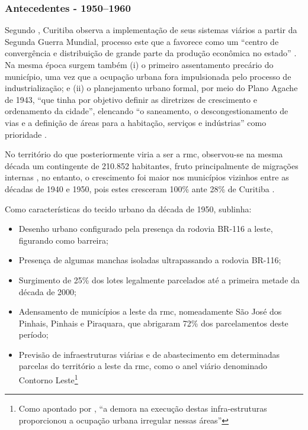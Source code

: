 	\subsubsection{Antecedentes - 1950--1960}
	Segundo , Curitiba observa a implementação de seus sistemas viários a partir da Segunda Guerra Mundial, processo este que a favorece como um ``centro de convergência e distribuição de grande parte da produção econômica no estado'' . Na mesma época surgem também (i) o primeiro assentamento precário do município, uma vez que a ocupação urbana fora impulsionada pelo processo de industrialização; e (ii) o planejamento urbano formal, por meio do Plano Agache de 1943, ``que tinha por objetivo definir as diretrizes de crescimento e ordenamento da cidade'', elencando ``o saneamento, o descongestionamento de vias e a definição de áreas para a habitação, serviços e indústrias'' como prioridade \cite[p. 52]{castro2005a}.
	
	No território do que posteriormente viria a ser a \gls{rmc}, observou-se na mesma década um contingente de 210.852 habitantes, fruto principalmente de migrações internas \cite[p. 53]{castro2005a}, no entanto, o crescimento foi maior nos municípios vizinhos entre as décadas de 1940 e 1950, pois estes cresceram 100\% ante 28\% de Curitiba .
	
	Como características do tecido urbano da década de 1950,  sublinha:
	
	\begin{itemize}
		\item Desenho urbano configurado pela presença da rodovia BR-116 a leste, figurando como barreira;
		\item Presença de algumas manchas isoladas ultrapassando a rodovia BR-116;
		\item Surgimento de 25\% dos lotes legalmente parcelados até a primeira metade da década de 2000;
		\item Adensamento de municípios a leste da \gls{rmc}, nomeadamente São José dos Pinhais, Pinhais e Piraquara, que abrigaram 72\% dos parcelamentos deste período;
		\item Previsão de infraestruturas viárias e de abastecimento em determinadas parcelas do território a leste da \gls{rmc}, como o anel viário denominado Contorno Leste\footnote{Como apontado por , ``a demora na execução destas infra-estruturas proporcionou a ocupação urbana irregular nessas áreas''}
	\end{itemize}
	
